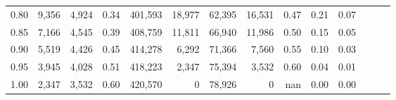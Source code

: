 \begin{tabular}{rrrrrrrrrrrrrr}
0.80 &   9,356 &  4,924 &  0.34 &  401,593 &   18,977 &  62,395 &  16,531 &  0.47 &  0.21 &      0.07 \\
0.85 &   7,166 &  4,545 &  0.39 &  408,759 &   11,811 &  66,940 &  11,986 &  0.50 &  0.15 &      0.05 \\
0.90 &   5,519 &  4,426 &  0.45 &  414,278 &    6,292 &  71,366 &   7,560 &  0.55 &  0.10 &      0.03 \\
0.95 &   3,945 &  4,028 &  0.51 &  418,223 &    2,347 &  75,394 &   3,532 &  0.60 &  0.04 &      0.01 \\
1.00 &   2,347 &  3,532 &  0.60 &  420,570 &        0 &  78,926 &       0 &   nan &  0.00 &      0.00 \\
\bottomrule
\end{tabular}
